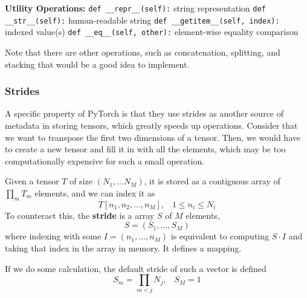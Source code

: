 \documentclass{article}
\begin{document}
\begin{algorithm}[H]
\begin{algorithmic}[1]
        \State \textbf{Utility Operations:}
        \State \texttt{def \_\_repr\_\_(self):}
            \State \hspace{2em}\Return string representation
        \State \texttt{def \_\_str\_\_(self):}
            \State \hspace{2em}\Return human-readable string
        \State \texttt{def \_\_getitem\_\_(self, index):}
            \State \hspace{2em}\Return indexed value(s)
        \State \texttt{def \_\_eq\_\_(self, other):}
            \State \hspace{2em}\Return element-wise equality comparison
    \end{algorithmic}
  \end{algorithm}

  Note that there are other operations, such as concatenation, splitting, and stacking that would be a good idea to implement.  

  \subsubsection{Strides} 

    A specific property of PyTorch is that they use strides as another source of metadata in storing tensors, which greatly speeds up operations. Consider that we want to transpose the first two dimensions of a tensor. Then, we would have to create a new tensor and fill it in with all the elements, which may be too computationally expensive for such a small operation. 

    \begin{definition}[Stride] 
      Given a tensor $T$ of size $(N_1, \ldots N_M)$, it is stored as a contiguous array of $\prod_m T_m$ elements, and we can index it as 
      \begin{equation}
        T[n_1, n_2, \ldots, n_M], \;\;\; 1 \leq n_i \leq N_i
      \end{equation} 
      To counteract this, the \textbf{stride} is a array $S$ of $M$ elements, 
      \begin{equation}
        S = (S_1, \ldots, S_M)
      \end{equation} 
      where indexing with some $I = (n_1, \ldots, n_M)$ is equivalent to computing $S \cdot I$ and taking that index in the array in memory. It defines a mapping. 
    \end{definition}

    If we do some calculation, the default stride of such a vector is defined 
    \begin{equation}
      S_m = \prod_{m < j} N_j, \;\;\; S_M = 1
    \end{equation}
\end{document}

